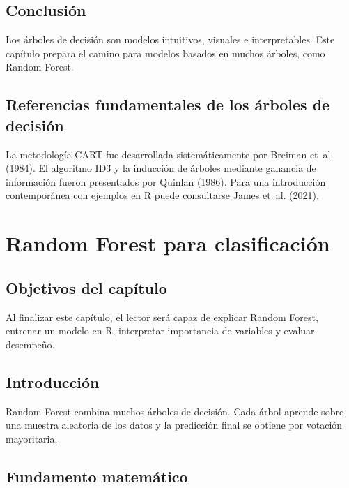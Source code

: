 \documentclass[
  spanish,
  10.5pt,
  letterpaper,
  openany,
  headings=big]{scrbook}
\begin{document}
\section{Conclusión}\label{conclusiuxf3n-4}

Los árboles de decisión son modelos intuitivos, visuales e
interpretables. Este capítulo prepara el camino para modelos basados en
muchos árboles, como Random Forest.

\section{Referencias fundamentales de los árboles de
decisión}\label{referencias-fundamentales-de-los-uxe1rboles-de-decisiuxf3n}

La metodología CART fue desarrollada sistemáticamente por Breiman et~al.
(1984). El algoritmo ID3 y la inducción de árboles mediante ganancia de
información fueron presentados por Quinlan (1986). Para una introducción
contemporánea con ejemplos en R puede consultarse James et~al. (2021).


\chapter{Random Forest para
clasificación}\label{random-forest-para-clasificaciuxf3n}

\section{Objetivos del capítulo}\label{objetivos-del-capuxedtulo-7}

Al finalizar este capítulo, el lector será capaz de explicar Random
Forest, entrenar un modelo en R, interpretar importancia de variables y
evaluar desempeño.

\section{Introducción}\label{introducciuxf3n-3}

Random Forest combina muchos árboles de decisión. Cada árbol aprende
sobre una muestra aleatoria de los datos y la predicción final se
obtiene por votación mayoritaria.

\section{Fundamento matemático}\label{fundamento-matemuxe1tico-2}
\end{document}
